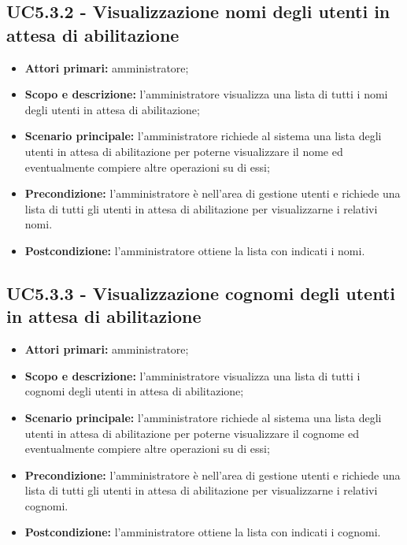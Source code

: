 \documentclass[AnalisiDeiRequisiti.tex]{subfiles}
\begin{document}
\subsection{UC5.3.2 - Visualizzazione nomi degli utenti in attesa di abilitazione}
\begin{itemize}
	\item \textbf{Attori primari:} amministratore;
	\item \textbf{Scopo e descrizione:} l'amministratore visualizza una lista di tutti i nomi degli utenti in attesa di abilitazione;
	\item \textbf{Scenario principale:} l'amministratore richiede al sistema una lista degli utenti in attesa di abilitazione per poterne visualizzare il nome ed eventualmente compiere altre operazioni su di essi;
	\item \textbf{Precondizione:} l'amministratore è nell'area di gestione utenti e richiede una lista di tutti gli utenti in attesa di abilitazione per visualizzarne i relativi nomi.
	\item \textbf{Postcondizione:} l'amministratore ottiene la lista con indicati i nomi.
\end{itemize}
\subsection{UC5.3.3 - Visualizzazione cognomi degli utenti in attesa di abilitazione}
\begin{itemize}
	\item \textbf{Attori primari:} amministratore;
	\item \textbf{Scopo e descrizione:} l'amministratore visualizza una lista di tutti i cognomi degli utenti in attesa di abilitazione;
	\item \textbf{Scenario principale:} l'amministratore richiede al sistema una lista degli utenti in attesa di abilitazione per poterne visualizzare il cognome ed eventualmente compiere altre operazioni su di essi;
	\item \textbf{Precondizione:} l'amministratore è nell'area di gestione utenti e richiede una lista di tutti gli utenti in attesa di abilitazione per visualizzarne i relativi cognomi.
	\item \textbf{Postcondizione:} l'amministratore ottiene la lista con indicati i cognomi.
\end{itemize}
\end{document}
